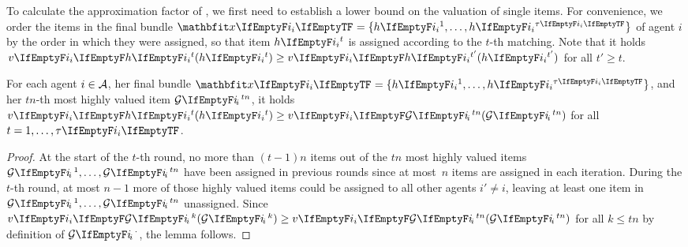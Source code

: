 To calculate the approximation factor of \SMatch, we first need to establish a lower bound on the valuation of single items.
For convenience, we order the items in the final bundle \(\alloc = \{\asgd{1}, \dots, \asgd{\alloclen}\}\) of agent \(i\) by the order in which they were assigned, so that item \(\asgd{t}\) is assigned according to the \(t\)-th matching.
Note that it holds \(\valuations[\asgd{t}] \ge \valuations[\asgd{t'}]\) for all \(t' \ge t\).
\begin{lemma}
	\label{lem:lower_bound_single_item}
	For each agent \(i \in \mathcal{A}\), her final bundle \(\alloc = \{\asgd{1}, \dots, \asgd{\alloclen}\}\), and her \(tn\)-th most highly valued item \(\goodsordered{tn}\), it holds \(\valuations[\asgd{t}] \geq \valuations[\goodsordered{tn}]\) for all \(t = 1, \dots, \alloclen\).
\end{lemma}
\begin{proof}
	At the start of the \(t\)-th round, no more than \((t-1) n\) items out of the \(tn\) most highly valued items \(\goodsordered{1}, \dots, \goodsordered{tn}\) have been assigned in previous rounds since at most~\(n\) items are assigned in each iteration.
	During the \(t\)-th round, at most \(n-1\) more of those highly valued items could be assigned to all other agents \(i' \neq i\), leaving at least one item in \(\goodsordered{1}, \dots, \goodsordered{tn}\) unassigned.
	Since \(\valuations[\goodsordered{k}] \geq \valuations[\goodsordered{tn}]\) for all \(k \leq tn\) by definition of \(\goodsordered{\cdot}\), the lemma follows.
\end{proof}

